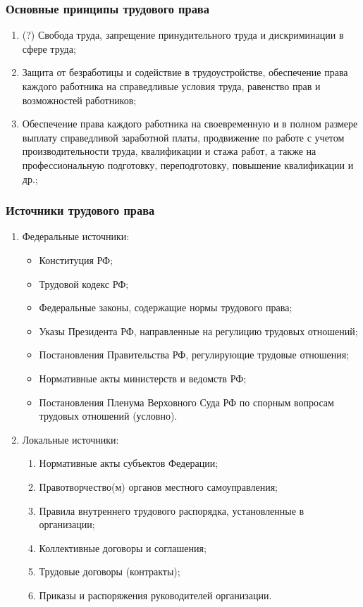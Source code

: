 \subsubsection{Основные принципы трудового права}
\begin{enumerate}
	\item (?) Свобода труда, запрещение принудительного труда и дискриминации в сфере труда;
	\item Защита от безработицы и содействие в трудоустройстве, обеспечение права каждого работника на справедливые условия труда, равенство прав и возможностей работников;
	\item Обеспечение права каждого работника на своевременную и в полном размере выплату справедливой заработной платы, продвижение по работе с учетом производительности труда, квалификации и стажа работ, а также на профессиональную подготовку, переподготовку, повышение квалификации и др.;
\end{enumerate}

\subsubsection{Источники трудового права}
\begin{enumerate}
	\item Федеральные источники:
	\begin{itemize}
		\item Конституция РФ;
		\item Трудовой кодекс РФ;
		\item Федеральные законы, содержащие нормы трудового права;
		\item Указы Президента РФ, направленные на регулицию трудовых отношений;
		\item Постановления Правительства РФ, регулирующие трудовые отношения;
		\item Нормативные акты министерств и ведомств РФ;
		\item Постановления Пленума Верховного Суда РФ по спорным вопросам трудовых отношений (условно).
	\end{itemize}
	\item Локальные источники:
	\begin{enumerate}
		\item Нормативные акты субъектов Федерации;
		\item Правотворчество(м) органов местного самоуправления;
		\item Правила внутреннего трудового распорядка, установленные в организации;
		\item Коллективные договоры и соглашения;
		\item Трудовые договоры (контракты);
		\item Приказы и распоряжения руководителей организации.
	\end{enumerate}
\end{enumerate}


